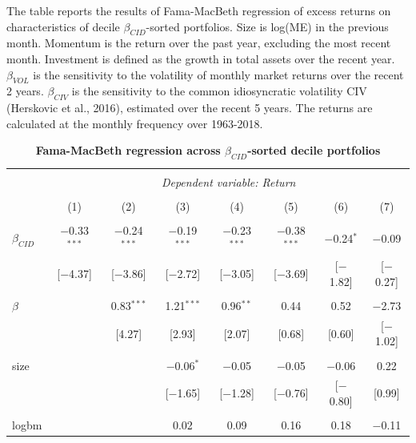 \documentclass[12pt]{article}
\begin{document}
\begin{table}[!htbp] \centering 
  \caption{\textbf{Fama-MacBeth regression across $\beta_{CID}$-sorted decile portfolios}} 
  \label{} 
  \begin{flushleft}
    {\medskip\small
The table reports the results of Fama-MacBeth regression of excess returns on characteristics of decile $\beta_{CID}$-sorted portfolios. Size is log(ME) in the previous month. Momentum is the return over the past year, excluding the most recent month. Investment is defined as the growth in total assets over the recent year. $\beta_{VOL}$ is the sensitivity to the volatility of monthly market returns over the recent 2 years. $\beta_{CIV}$ is the sensitivity to the common idiosyncratic volatility CIV (Herskovic et al., 2016), estimated over the recent 5 years. The returns are calculated at the monthly frequency over 1963-2018.}
    \medskip
    \end{flushleft}
\begin{tabular}{@{\extracolsep{5pt}}lccccccc} 
\\[-1.8ex]\hline 
\hline \\[-1.8ex] 
 & \multicolumn{7}{c}{\textit{Dependent variable: Return}} \\ 
\cline{2-8} 
\\[-1.8ex] & (1) & (2) & (3) & (4) & (5) & (6) & (7)\\ 
\hline \\[-1.8ex] 
 $\beta_{CID}$ & $-$0.33$^{***}$ & $-$0.24$^{***}$ & $-$0.19$^{***}$ & $-$0.23$^{***}$ & $-$0.38$^{***}$ & $-$0.24$^{*}$ & $-$0.09 \\ 
  & [$-$4.37] & [$-$3.86] & [$-$2.72] & [$-$3.05] & [$-$3.69] & [$-$1.82] & [$-$0.27] \\ 
  & & & & & & & \\ 
 $\beta$ &  & 0.83$^{***}$ & 1.21$^{***}$ & 0.96$^{**}$ & 0.44 & 0.52 & $-$2.73 \\ 
  &  & [4.27] & [2.93] & [2.07] & [0.68] & [0.60] & [$-$1.02] \\ 
  & & & & & & & \\ 
 size &  &  & $-$0.06$^{*}$ & $-$0.05 & $-$0.05 & $-$0.06 & 0.22 \\ 
  &  &  & [$-$1.65] & [$-$1.28] & [$-$0.76] & [$-$0.80] & [0.99] \\ 
  & & & & & & & \\ 
 logbm &  &  & 0.02 & 0.09 & 0.16 & 0.18 & $-$0.11 \\ 

\end{tabular}
\end{table}
\end{document}
